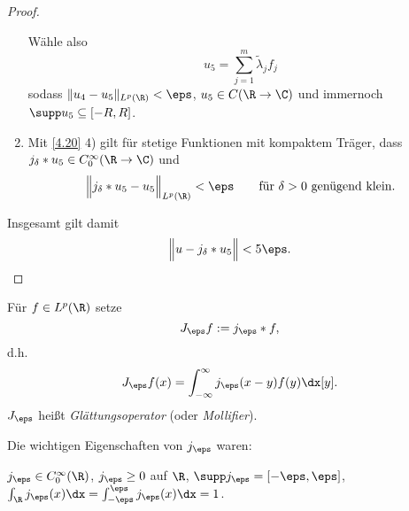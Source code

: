 \begin{st}
\begin{proof}
\begin{enumerate}[1)]
				Wähle also
				\[
					u_5 = \sum_{j=1}^m \tilde \lambda_j f_j
				\]
				sodass $\|u_4 - u_5\|_{L^p(\R)} < \eps$, $u_5 \in C(\R \to \C)$ und immernoch $\supp u_5 \subset [-R,R]$.
			\item
				Mit \ref{4.20} 4) gilt für stetige Funktionen mit kompaktem Träger, dass $j_\delta \ast u_5 \in C_0^\infty(\R \to \C)$ und
				\[
					\Big\|j_\delta \ast u_5 - u_5 \Big\|_{L^p(\R)} < \eps \qquad \text{für $\delta > 0$ genügend klein.}
				\]
		\end{enumerate}
		Insgesamt gilt damit
		\[
			\Big\|u - j_\delta \ast u_5 \Big\| < 5\eps.
		\]
	\end{proof}
\end{st}

\begin{df} \label{4.19}
	Für $f \in L^p(\R)$ setze
	\[
		J_\eps f := j_\eps \ast f,
	\]
	d.h.
	\[
		J_\eps f(x) = \int_{-\infty}^\infty j_\eps (x-y) f(y) \dx[y].
	\]
	$J_\eps$ heißt \emph{Glättungsoperator} (oder \emph{Mollifier}).
	\begin{note}
		Die wichtigen Eigenschaften von $j_\eps$ waren:

		$j_\eps \in C_0^\infty(\R)$, $j_\eps \ge 0$ auf $\R$, $\supp j_\eps = [-\eps,\eps]$, $\int_{\R} j_\eps(x) \dx = \int_{-\eps}^\eps j_\eps(x) \dx = 1$.
	\end{note}
\end{df}

